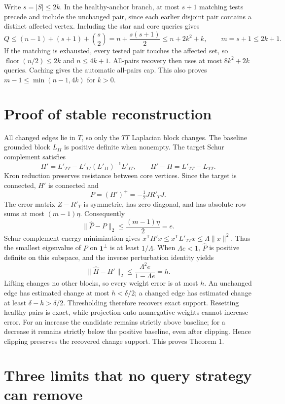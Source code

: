 \documentclass[11pt,letterpaper]{article}
\begin{document}
Write $s=|S|\le2k$. In the healthy-anchor branch, at most $s+1$ matching tests precede and include the unchanged pair, since each earlier disjoint pair contains a distinct affected vertex. Including the star and core queries gives
\[
 Q\le(n-1)+(s+1)+\binom s2
   =n+\frac{s(s+1)}2\le n+2k^2+k,
 \qquad m=s+1\le2k+1.
\]
If the matching is exhausted, every tested pair touches the affected set, so $\operatorname{floor}(n/2)\le2k$ and $n\le4k+1$. All-pairs recovery then uses at most $8k^2+2k$ queries. Caching gives the automatic all-pairs cap. This also proves $m-1\le\min(n-1,4k)$ for $k>0$.

\section{Proof of stable reconstruction}
All changed edges lie in $T$, so only the $TT$ Laplacian block changes. The baseline grounded block $L_{II}$ is positive definite when nonempty. The target Schur complement satisfies
\[
 H'=L'_{TT}-L'_{TI}(L'_{II})^{-1}L'_{IT},
 \qquad H'-H=L'_{TT}-L_{TT}.
\]
Kron reduction preserves resistance between core vertices. Since the target is connected, $H'$ is connected and
\[
 P=(H')^+=-\tfrac12 JR'_TJ.
\]
The error matrix $Z-R'_T$ is symmetric, has zero diagonal, and has absolute row sums at most $(m-1)\eta$. Consequently
\[
 \|\widehat P-P\|_2\le\frac{(m-1)\eta}{2}=e.
\]
Schur-complement energy minimization gives $x^{\mathsf T}H'x\le x^{\mathsf T}L'_{TT}x\le\Lambda\|x\|^2$. Thus the smallest eigenvalue of $P$ on $\mathbf1^\perp$ is at least $1/\Lambda$. When $\Lambda e<1$, $\widehat P$ is positive definite on this subspace, and the inverse perturbation identity yields
\[
 \|\widehat H-H'\|_2
 \le\frac{\Lambda^2e}{1-\Lambda e}=h.
\]
Lifting changes no other blocks, so every weight error is at most $h$. An unchanged edge has estimated change at most $h<\delta/2$; a changed edge has estimated change at least $\delta-h>\delta/2$. Thresholding therefore recovers exact support. Resetting healthy pairs is exact, while projection onto nonnegative weights cannot increase error. For an increase the candidate remains strictly above baseline; for a decrease it remains strictly below the positive baseline, even after clipping. Hence clipping preserves the recovered change support. This proves Theorem 1.

\section{Three limits that no query strategy can remove}
\end{document}
